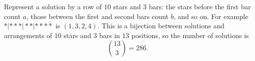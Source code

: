 Represent a solution by a row of \(10\) stars and \(3\) bars: the stars before the first bar count \(a\), those between the first and second bars count \(b\), and so on. For example \(\ast|\ast\ast\ast|\ast\ast|\ast\ast\ast\ast\) is \((1,3,2,4)\). This is a bijection between solutions and arrangements of \(10\) stars and \(3\) bars in \(13\) positions, so the number of solutions is
\[
\binom{13}{3}=\boxed{286}.
\]
